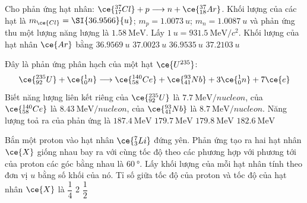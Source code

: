 \begin{ex}
	Cho phản ứng hạt nhân: $\ce{_{17}^{37}Cl}+p \longrightarrow n+ \ce{_{18}^{37}Ar}$. Khối lượng của các hạt là $m_{\ce{Cl}}=\SI{36.9566}{u}$; $m_p=\SI{1.0073}{u}$;   $m_n=\SI{1.0087}{u}$ và phản ứng thu một lượng năng lượng là $\SI{1.58}{\mega\electronvolt}$. Lấy $\SI{1}{u}=\SI{931.5}{\mega\electronvolt/c^2}$. Khối lượng của hạt nhân $\ce{Ar}$ bằng
	\choice
	{\True $\SI{36.9569}{u}$}
	{$\SI{37.0023}{u}$}
	{$\SI{36.9535}{u}$}
	{$\SI{37.2103}{u}$}
\end{ex}
\begin{ex}
	Đây là phản ứng phân hạch của một hạt $\ce{U^{235}}$:
	$$
	\ce{_{92}^{235}U}+\ce{_0^1n} \longrightarrow\ce{_{58}^{140}Ce}+ \ce{_{41}^{93}Nb}+3 \ce{_0^1n}+7 \ce{e}
	$$
	Biết năng lượng liên kết riêng của $\ce{_{92}^{235}U}$ là $\SI{7.7}{\mega\electronvolt/nucleon}$, của $\ce{_{58}^{140}Ce}$ là $\SI{8.43}{\mega\electronvolt/nucleon}$, của $\ce{_{41}^{93}Nb}$ là $\SI{8.7}{\mega\electronvolt/nucleon}$. Năng lượng toả ra của phản ứng là
	\choice
	{$\SI{187.4}{\mega\electronvolt}$}
	{$\SI{179.7}{\mega\electronvolt}$}
	{\True $\SI{179.8}{\mega\electronvolt}$}
	{$\SI{182.6}{\mega\electronvolt}$}
\end{ex}
\begin{ex}
	Bắn một proton vào hạt nhân $\ce{^7_3Li}$ đứng yên. Phản ứng tạo ra hai hạt nhân $\ce{X}$ giống nhau bay ra với cùng tốc độ theo các phương hợp với phương tới của proton các góc bằng nhau là $\SI{60}{\degree}$. Lấy khối lượng của mỗi hạt nhân tính theo đơn vị $\si{u}$ bằng số khối của nó. Tỉ số giữa tốc độ của proton và tốc độ của hạt nhân $\ce{X}$ là
	\choice
	{}
	{$\dfrac{1}{4}$}
	{2}
	{$\dfrac{1}{2}$}
\end{ex}
